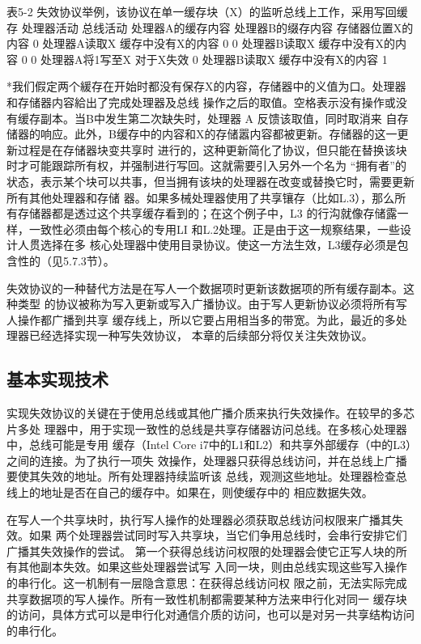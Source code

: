 表5-2 失效协议举例，该协议在单一缓存块（X）的监听总线上工作，采用写回缓存
处理器活动
总线活动
处理器A的缓存内容
处理器B的缀存内容 存储器位置X的内容
0
处理器A读取X
缓存中没有X的内容
0
0
处理器B读取X
缓存中没有X的内容
0
0
处理器A将1写至X
对于X失效
0
处理器B读取X
缓存中没有X的内容
1

*我们假定两个緩存在开始时都没有保存X的内容，存储器中的义值为口。处理器和存储器内容給出了完成处理器及总线
操作之后的取值。空格表示没有操作或没有缓存副本。当B中发生第二次缺失时，处理器 A 反馈该取值，同时取消来
自存储器的响应。此外，B缓存中的内容和X的存储嚣内容都被更新。存储器的这一更新过程是在存储器块变共享时
进行的，这种更新简化了协议，但只能在替换该块时才可能跟踪所有权，并强制进行写回。这就需要引入另外一个名为
“拥有者”的状态，表示某个块可以共事，但当拥有该块的处理器在改变或替換它时，需要更新所有其他处理器和存储
器。如果多械处理器使用了共享镶存（比如L.3），那么所有存储器都是透过这个共享缓存看到的；在这个例子中，L3
的行沟就像存储露一样，一致性必须由每个核心的专用LI 和L.2处理。正是由于这一规察结果，一些设计人贯选择在多
核心处理器中使用目录协议。使这一方法生效，L3缓存必须是包含性的（见5.7.3节）。

失效协议的一种替代方法是在写人一个数据项时更新该数据项的所有缓存副本。这种类型
的协议被称为写入更新或写入广播协议。由于写人更新协议必须将所有写人操作都广播到共享
缓存线上，所以它要占用相当多的带宽。为此，最近的多处理器已经选择实现一种写失效协议，
本章的后续部分将仅关注失效协议。
\subsection{基本实现技术}
实现失效协议的关键在于使用总线或其他广播介质来执行失效操作。在较早的多芯片多处
理器中，用于实现一致性的总线是共享存储器访问总线。在多核心处理器中，总线可能是专用
缓存（Intel Core i7中的L1和L2）和共享外部缓存（中的L3）之间的连接。为了执行一项失
效操作，处理器只获得总线访问，并在总线上广播要使其失效的地址。所有处理器持续监听该
总线，观测这些地址。处理器检查总线上的地址是否在自己的缓存中。如果在，则使缓存中的
相应数据失效。

在写人一个共享块时，执行写人操作的处理器必须获取总线访问权限来广播其失效。如果
两个处理器尝试同时写入共享块，当它们争用总线时，会串行安排它们广播其失效操作的尝试。
第一个获得总线访问权限的处理器会使它正写人块的所有其他副本失效。如果这些处理器尝试写
入同一块，则由总线实现这些写入操作的串行化。这一机制有一层隐含意思：在获得总线访问权
限之前，无法实际完成共享数据项的写人操作。所有一致性机制都需要某种方法来申行化对同一
缓存块的访问，具体方式可以是申行化对通信介质的访问，也可以是对另一共享结构访问的串行化。

